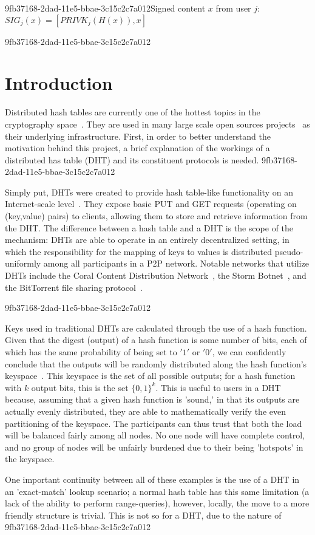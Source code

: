 \documentclass[12pt]{article}
\begin{document}
9fb37168-2dad-11e5-bbae-3c15c2c7a012Signed content $x$ from user $j$: $SIG_j(x) = \left[ PRIVK_j( H(x) ), x \right]$

9fb37168-2dad-11e5-bbae-3c15c2c7a012\section{Introduction}
\par Distributed hash tables are currently one of the hottest topics in the cryptography space~\cite{Stoica:2001dj,Rowstron:2001ea,Ratnasamy:2001wn}. They are used in many large scale open sources projects~\cite{Freitas:2013tb,Xu:2010vs,Perfitt:2010fh} as their underlying infrastructure. First, in order to better understand the motivation behind this project, a brief explanation of the workings of a distributed has table (DHT) and its constituent protocols is needed.
9fb37168-2dad-11e5-bbae-3c15c2c7a012
\par Simply put, DHTs were created to provide hash table-like functionality on an Internet-scale level~\cite{Ratnasamy:2001wn}. They expose basic PUT and GET requests (operating on (key,value) pairs) to clients, allowing them to store and retrieve information from the DHT. The difference between a hash table and a DHT is the scope of the mechanism: DHTs are able to operate in an entirely decentralized setting, in which the responsibility for the mapping of keys to values is distributed pseudo-uniformly among all participants in a P2P network. Notable networks that utilize DHTs include the Coral Content Distribution Network~\cite{Freedman:2004vb}, the Storm Botnet~\cite{Holz:2008uk}, and the BitTorrent file sharing protocol~\cite{Cohen:y1_8mBnw}.

9fb37168-2dad-11e5-bbae-3c15c2c7a012\par Keys used in traditional DHTs are calculated through the use of a hash function. Given that the digest (output) of a hash function is some number of bits, each of which has the same probability of being set to $'1'$ or $'0'$, we can confidently conclude that the outputs will be randomly distributed along the hash function's keyspace~. This keyspace is the set of all possible outputs; for a hash function with $k$ output bits, this is the set $\{0,1\}^k$. This is useful to users in a DHT because, assuming that a given hash function is 'sound,' in that its outputs are actually evenly distributed, they are able to mathematically verify the even partitioning of the keyspace. The participants can thus trust that both the load will be balanced fairly among all nodes. No one node will have complete control, and no group of nodes will be unfairly burdened due to their being 'hotspots' in the keyspace.~

\par One important continuity between all of these examples is the use of a DHT in an 'exact-match' lookup scenario; a normal hash table has this same limitation (a lack of the ability to perform range-queries), however, locally, the move to a more friendly structure is trivial. This is not so for a DHT, due to the nature of
9fb37168-2dad-11e5-bbae-3c15c2c7a012\printbibliography
\end{document}
